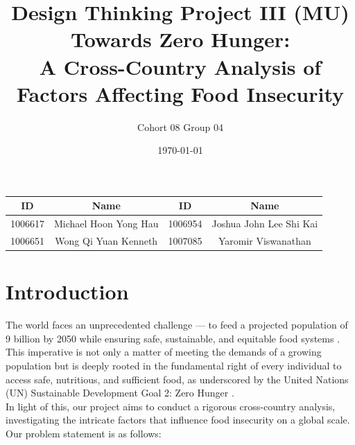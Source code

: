 \documentclass{article}
\title{\Bigg01.020 Design Thinking Project III (MU) \\ Towards Zero Hunger: \\ A Cross-Country Analysis of Factors Affecting Food Insecurity}
\author{Cohort 08 Group 04}
\date{\today}
\begin{document}
\maketitle
\thispagestyle{empty}

\begin{center}
\begin{tabular}{ |c|c|c|c| } 
 \hline
  ID & Name & ID & Name \\
 \hline
  1006617 & Michael Hoon Yong Hau & 1006954 & Joshua John Lee Shi Kai \\
 \hline
  1006651 & Wong Qi Yuan Kenneth & 1007085 & Yaromir Viswanathan \\
 \hline
\end{tabular}
\end{center} 



\tableofcontents

\newpage
\setcounter{page}{1}

\section{Introduction} 
The world faces an unprecedented challenge — to feed a projected population of 9 billion by 2050 while ensuring safe, sustainable, and equitable food systems \cite{doi:10.1126/science.1185383}. This imperative is not only a matter of meeting the demands of a growing population but is deeply rooted in the fundamental right of every individual to access safe, nutritious, and sufficient food, as underscored by the United Nations (UN) Sustainable Development Goal 2: Zero Hunger \cite{unsdg2}. \\

\noindent In light of this, our project aims to conduct a rigorous cross-country analysis, investigating the intricate factors that influence food insecurity on a global scale. Our problem statement is as follows: 
\end{document}

